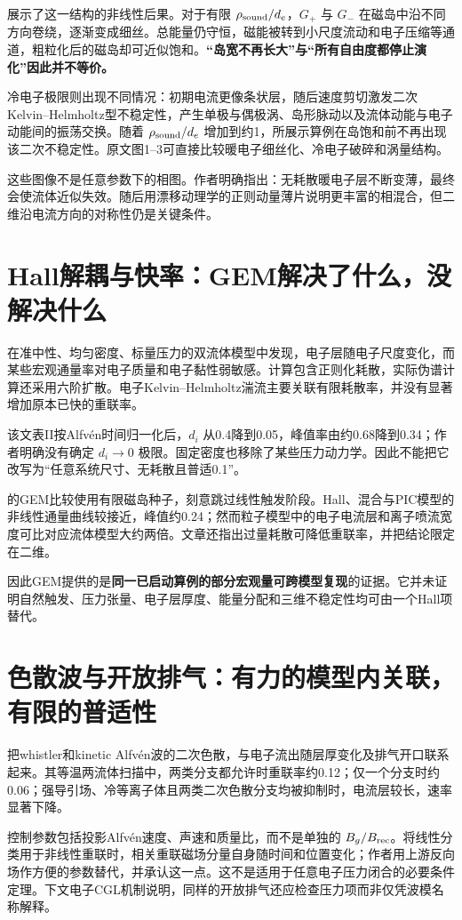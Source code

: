 \citet{L049}展示了这一结构的非线性后果。对于有限 $\rho_{\rm sound}/d_e$，$G_+$ 与 $G_-$ 在磁岛中沿不同方向卷绕，逐渐变成细丝。总能量仍守恒，磁能被转到小尺度流动和电子压缩等通道，粗粒化后的磁岛却可近似饱和。\textbf{“岛宽不再长大”与“所有自由度都停止演化”因此并不等价。}

冷电子极限则出现不同情况：初期电流更像条状层，随后速度剪切激发二次Kelvin--Helmholtz型不稳定性，产生单极与偶极涡、岛形脉动以及流体动能与电子动能间的振荡交换。随着 $\rho_{\rm sound}/d_e$ 增加到约1，所展示算例在岛饱和前不再出现该二次不稳定性。原文图1--3可直接比较暖电子细丝化、冷电子破碎和涡量结构。

这些图像不是任意参数下的相图。作者明确指出：无耗散暖电子层不断变薄，最终会使流体近似失效。随后用漂移动理学的正则动量薄片说明更丰富的相混合，但二维沿电流方向的对称性仍是关键条件。

\section{Hall解耦与快率：GEM解决了什么，没解决什么}
\citet{Biskamp1997}在准中性、均匀密度、标量压力的双流体模型中发现，电子层随电子尺度变化，而某些宏观通量率对电子质量和电子黏性弱敏感。计算包含正则化耗散，实际伪谱计算还采用六阶扩散。电子Kelvin--Helmholtz湍流主要关联有限耗散率，并没有显著增加原本已快的重联率。

该文表II按Alfvén时间归一化后，$d_i$ 从0.4降到0.05，峰值率由约0.68降到0.34；作者明确没有确定 $d_i\to0$ 极限。固定密度也移除了某些压力动力学。因此不能把它改写为“任意系统尺寸、无耗散且普适0.1”。

\citet{Birn2001}的GEM比较使用有限磁岛种子，刻意跳过线性触发阶段。Hall、混合与PIC模型的非线性通量曲线较接近，峰值约0.24；然而粒子模型中的电子电流层和离子喷流宽度可比对应流体模型大约两倍。文章还指出过量耗散可降低重联率，并把结论限定在二维。

因此GEM提供的是\textbf{同一已启动算例的部分宏观量可跨模型复现}的证据。它并未证明自然触发、压力张量、电子层厚度、能量分配和三维不稳定性均可由一个Hall项替代。

\section{色散波与开放排气：有力的模型内关联，有限的普适性}
\citet{Rogers2001}把whistler和kinetic Alfvén波的二次色散，与电子流出随层厚变化及排气开口联系起来。其等温两流体扫描中，两类分支都允许时重联率约0.12；仅一个分支时约0.06；强导引场、冷等离子体且两类二次色散分支均被抑制时，电流层较长，速率显著下降。

控制参数包括投影Alfvén速度、声速和质量比，而不是单独的 $B_g/B_{\rm rec}$。将线性分类用于非线性重联时，相关重联磁场分量自身随时间和位置变化；作者用上游反向场作方便的参数替代，并承认这一点。这不是适用于任意电子压力闭合的必要条件定理。下文电子CGL机制说明，同样的开放排气还应检查压力项而非仅凭波模名称解释。

